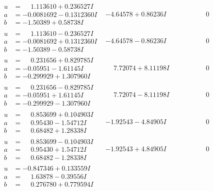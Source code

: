 \documentclass[1p]{elsarticle_modified}
\theoremstyle{definition}
\begin{document}
$$\begin{array}{c|c|c}
 \hline 
\begin{aligned}
u &= \phantom{-}1.113610 + 0.236527 I \\
a &= -0.0081692 - 0.1312360 I \\
b &= -1.50389 + 0.58738 I\end{aligned}
 & -4.64578 + 0.86236 I & \phantom{-0.000000 } 0 \\ \hline\begin{aligned}
u &= \phantom{-}1.113610 - 0.236527 I \\
a &= -0.0081692 + 0.1312360 I \\
b &= -1.50389 - 0.58738 I\end{aligned}
 & -4.64578 - 0.86236 I & \phantom{-0.000000 } 0 \\ \hline\begin{aligned}
u &= \phantom{-}0.231656 + 0.829785 I \\
a &= -0.05951 - 1.61145 I \\
b &= -0.299929 + 1.307960 I\end{aligned}
 & \phantom{-}7.72074 + 8.11198 I & \phantom{-0.000000 } 0 \\ \hline\begin{aligned}
u &= \phantom{-}0.231656 - 0.829785 I \\
a &= -0.05951 + 1.61145 I \\
b &= -0.299929 - 1.307960 I\end{aligned}
 & \phantom{-}7.72074 - 8.11198 I & \phantom{-0.000000 } 0 \\ \hline\begin{aligned}
u &= \phantom{-}0.853699 + 0.104903 I \\
a &= \phantom{-}0.95430 - 1.54712 I \\
b &= \phantom{-}0.68482 + 1.28338 I\end{aligned}
 & -1.92543 - 4.84905 I & \phantom{-0.000000 } 0 \\ \hline\begin{aligned}
u &= \phantom{-}0.853699 - 0.104903 I \\
a &= \phantom{-}0.95430 + 1.54712 I \\
b &= \phantom{-}0.68482 - 1.28338 I\end{aligned}
 & -1.92543 + 4.84905 I & \phantom{-0.000000 } 0 \\ \hline\begin{aligned}
u &= -0.847346 + 0.133559 I \\
a &= \phantom{-}1.63878 - 0.39556 I \\
b &= \phantom{-}0.276780 + 0.779594 I\end{aligned}

\end{array}$$
\end{document}
